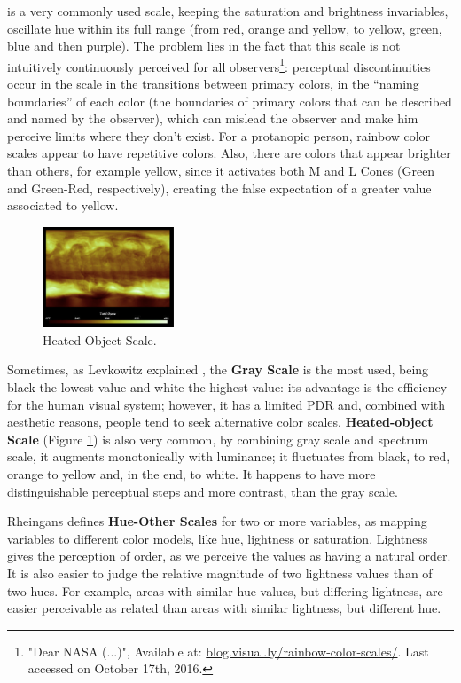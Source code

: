 is a very commonly used scale, keeping the saturation and brightness invariables, oscillate hue within its full
range (from red, orange and yellow, to yellow, green, blue and then purple). The problem lies in the fact that this scale
is not intuitively continuously perceived for all observers\footnote{"Dear NASA (...)",
Available at: \url{blog.visual.ly/rainbow-color-scales/}. Last accessed on October 17th, 2016.}:
perceptual discontinuities occur in the scale in the transitions between primary colors, in the “naming boundaries”
of each color (the boundaries of primary colors that can be described and named by the observer), which can mislead the
observer and make him perceive limits where they don’t exist. For a protanopic person, rainbow color scales
appear to have repetitive colors. Also, there are colors that appear brighter than
others, for example yellow, since it activates both M and L Cones (Green and Green-Red, respectively), creating
the false expectation of a greater value associated to yellow. \par
%
\begin{figure}
	\centering
    \vspace{-\baselineskip}
    \includegraphics[width=0.35\textwidth]{images/background/HeatedObjectScale.png}
    \caption[Heated-Object Scale Example]{Heated-Object Scale. \protect\cite{Rheingans2000}}
    \label{fig:heatedobject}
\end{figure}
%
Sometimes, as Levkowitz explained \cite{Levkowitz1996}, the \textbf{Gray Scale} is the most used,
being black the lowest value and white the highest value: its advantage is the efficiency for the human
visual system; however, it has a limited PDR and, combined with aesthetic reasons, people tend to seek
alternative color scales. \textbf{Heated-object Scale} (Figure \ref{fig:heatedobject}) is also very
common, by combining gray scale and
spectrum scale, it augments monotonically with luminance; it fluctuates from black, to red, orange to yellow
and, in the end, to white. It happens to have more distinguishable perceptual steps and more contrast, than
the gray scale. \par
%
Rheingans defines \textbf{Hue-Other Scales} for two or more variables, as mapping variables to
different color models, like hue, lightness or saturation. Lightness
gives the perception of order, as we perceive the values as having a natural order. It is also easier to
judge the relative magnitude of two lightness values than of two hues. For example, areas with similar hue
values, but differing lightness, are easier perceivable as related than areas with similar lightness, but
different hue.
%
